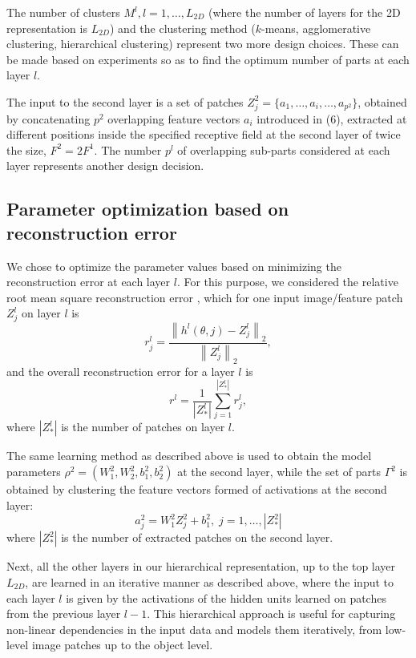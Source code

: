 \documentclass[runningheads]{llncs}
\begin{document}
The number of clusters $M^l, l=1,\ldots,L_{2D}$ (where the number of layers for the 2D representation is $L_{2D}$) and the clustering method ($k$-means, agglomerative clustering, hierarchical clustering) represent two more design choices. These can be made based on experiments so as to find the optimum number of parts at each layer $l$. 

The input to the second layer is a set of patches $Z_j^2=\{a_1,\ldots,a_i,\ldots,a_{p^2}\}$, obtained by concatenating  $p^2$ overlapping feature vectors $a_i$ introduced in (6), extracted at different positions inside the specified receptive field at the second layer of twice the size, $F^2=2F^1$. The number $p^l$ of overlapping sub-parts considered at each layer represents another design decision.

\subsection{Parameter optimization based on reconstruction error}

We chose to optimize the parameter values based on minimizing the reconstruction error at each layer $l$. For this purpose, we considered the relative root mean square reconstruction error \cite{Chai2014}, which for one input image/feature patch $Z_j^l$ on layer $l$ is
\begin{equation}
 r_j^l = \frac{\left\|h^l(\theta,j)-Z_j^l\right\|_2}{\left\|Z_j^l\right\|_2},
\end{equation}
and the overall reconstruction error for a layer $l$ is
\begin{equation}
  r^l = \frac{1}{|Z_*^l|} \sum_{j=1}^{|Z_*^l|} r_j^l,
  \label{eq:r}
\end{equation}
where $|Z_*^l|$ is the number of patches on layer $l$.

The same learning method as described above is used to obtain the model parameters $\rho^2=(W_1^2,W_2^2,b_1^2,b_2^2)$ at the second layer, while the set of parts $\Gamma^{2}$ is obtained by clustering the feature vectors formed of activations at the second layer:
\begin{equation}
a_j^2=W_1^2Z_j^2+b_1^2, \;j=1,\ldots,|Z_*^2|
\end{equation}
where $|Z_*^2|$ is the number of extracted patches on the second layer.

Next, all the other layers in our hierarchical representation, up to the top layer $L_{2D}$, are learned in an iterative manner as described above, where the input to each layer $l$ is given by the activations of the hidden units learned on patches from the previous layer $l-1$. This hierarchical approach is useful for capturing non-linear dependencies in the input data and models them iteratively, from low-level image patches up to the object level.
\end{document}
